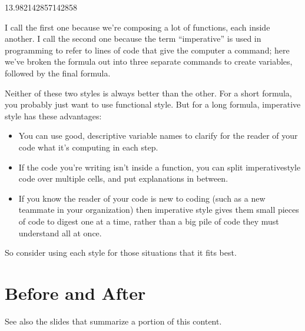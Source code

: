 \documentclass[letterpaper,10pt,english]{jupyterBook}
\begin{document}
\begin{sphinxVerbatim}[commandchars=\\\{\}]
13.982142857142858
\end{sphinxVerbatim}

\sphinxAtStartPar
I call the first one  because we’re composing a lot of functions, each inside another.  I call the second one  because the term “imperative” is used in programming to refer to lines of code that give the computer a command; here we’ve broken the formula out into three separate commands to create variables, followed by the final formula.

\sphinxAtStartPar
Neither of these two styles is always better than the other.  For a short formula, you probably just want to use functional style.  But for a long formula, imperative style has these advantages:
\begin{itemize}
\item {} 
\sphinxAtStartPar
You can use good, descriptive variable names to clarify for the reader of your code what it’s computing in each step.

\item {} 
\sphinxAtStartPar
If the code you’re writing isn’t inside a function, you can split imperative\sphinxhyphen{}style code over multiple cells, and put explanations in between.

\item {} 
\sphinxAtStartPar
If you know the reader of your code is new to coding (such as a new teammate in your organization) then imperative style gives them small pieces of code to digest one at a time, rather than a big pile of code they must understand all at once.

\end{itemize}

\sphinxAtStartPar
So consider using each style for those situations that it fits best.


\chapter{Before and After}
\label{\detokenize{chapter-5-before-and-after:before-and-after}}\label{\detokenize{chapter-5-before-and-after::doc}}
\sphinxAtStartPar
See also the slides that summarize a portion of this content.
\end{document}
